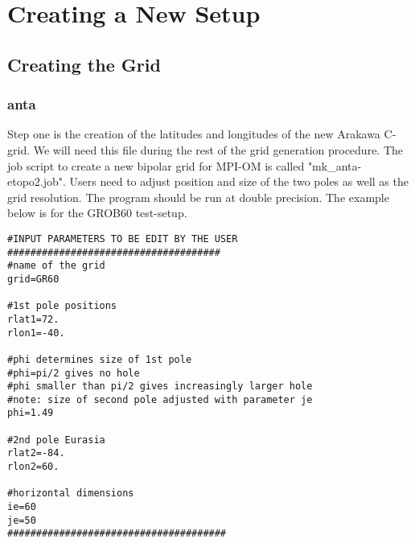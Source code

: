 %
%



\thispagestyle{empty}
 
\chapter[Creating a New Setup]
{\Large{\bf Creating a New Setup}\label{ch:setup}}

\section[Creating the Grid]
{\Large{\bf Creating the Grid}\label{ch:setup:grid}}

\subsection{anta}

Step one is the creation of the latitudes and longitudes of the new Arakawa C-grid.
We will need this file during the rest of the grid generation procedure.
The job script to create a new bipolar grid for MPI-OM is called "mk\_anta-etopo2.job".
Users need to adjust position and size of the two poles as well as the grid resolution.
The program should be run at double precision.
The example below is for the GROB60 test-setup.

\begin{footnotesize}
\begin{verbatim}
#INPUT PARAMETERS TO BE EDIT BY THE USER
#####################################
#name of the grid
grid=GR60

#1st pole positions
rlat1=72.
rlon1=-40.

#phi determines size of 1st pole
#phi=pi/2 gives no hole
#phi smaller than pi/2 gives increasingly larger hole
#note: size of second pole adjusted with parameter je
phi=1.49

#2nd pole Eurasia
rlat2=-84.
rlon2=60.

#horizontal dimensions
ie=60
je=50
######################################
\end{verbatim}
\end{footnotesize}



